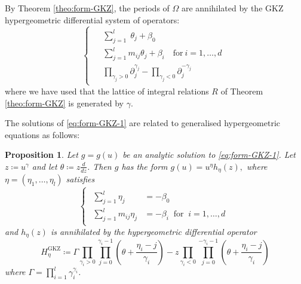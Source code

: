 \documentclass[11pt, reqno]{amsart}
\theoremstyle{plain}
\newtheorem{prop}[thm]{Proposition}
\theoremstyle{definition}
\begin{document}
By Theorem \ref{theo:form-GKZ}, the periods of $\Omega$ are annihilated by the GKZ hypergeometric differential system of operators:
\begin{equation}\label{eq:form-GKZ-1}
\left\{ 
\begin{array}{l}
\begin{aligned}
& \sum_{j=1}^l \; \theta_j   +\beta_0 \\
& \sum_{j=1}^l m_{ij} \theta_j + \beta_i \quad \text{for} \ i=1, \dots, d\\
& \prod_{\gamma_j>0} \partial_j^{\gamma_j} - \prod_{\gamma_j<0}  \partial_j^{-\gamma_j}  \; 
\end{aligned}
\end{array} \right.
\end{equation}
where we have used that the lattice of integral relations $R$ of Theorem \ref{theo:form-GKZ} is generated by $\gamma$.

The solutions of \eqref{eq:form-GKZ-1} are related to generalised hypergeometric equations as follows:
\begin{prop}\label{prop:reduc-of-GKZ}
Let $g=g(u)$ be an analytic solution to \eqref{eq:form-GKZ-1}. Let  $z\coloneqq u^\gamma$ and  let $\theta \coloneqq  z \frac{d}{dz}$.  Then $g$ has the form $g(u) = u^\eta h_\eta(z),$ where $\eta=(\eta_1, \dots, \eta_l)$
satisfies 
\begin{equation}\label{eq:eta-system}
\left\{ 
\begin{array}{l}
\begin{aligned}
\sum_{j=1}^l  \eta_j  &= -\beta_0\\
\sum_{j=1}^l m_{ij} \eta_j &= -\beta_i \ \text{ for } \  i=1,\dots,d
\end{aligned}
\end{array} \right.
\end{equation}
and $h_\eta(z)$ is annihilated by the hypergeometric differential operator 
\begin{equation}
\label{eq:H-red}
H^{\mathrm{GKZ}}_\eta \coloneqq \Gamma \prod_{\gamma_i >0}  \prod_{j=0}^{\gamma_i-1}\left( \theta + \frac{\eta_i- j}{\gamma_i} \right)- z  \prod_{\gamma_i <0}  \prod_{j=0}^{-\gamma_i-1} \left( \theta+ \frac{\eta_i - j}{\gamma_i} \right)  
\end{equation}
where $\Gamma = \prod_{i=1}^l \gamma_i ^{\gamma_i}$. 
\end{prop}
\end{document}

